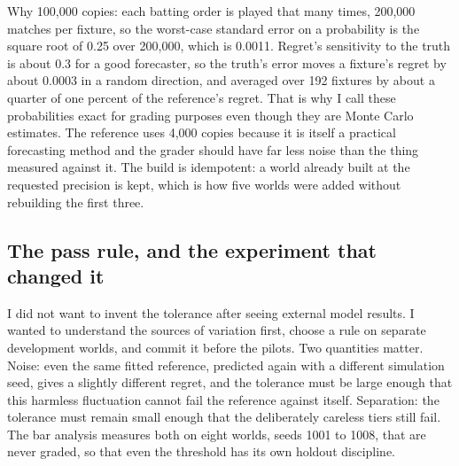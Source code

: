 \documentclass[11pt,letterpaper]{article}
\begin{document}
Why 100,000 copies: each batting order is played that many times, 200,000 matches per fixture, so the worst-case standard error on a probability is the square root of 0.25 over 200,000, which is 0.0011. Regret's sensitivity to the truth is about 0.3 for a good forecaster, so the truth's error moves a fixture's regret by about 0.0003 in a random direction, and averaged over 192 fixtures by about a quarter of one percent of the reference's regret. That is why I call these probabilities exact for grading purposes even though they are Monte Carlo estimates. The reference uses 4,000 copies because it is itself a practical forecasting method and the grader should have far less noise than the thing measured against it. The build is idempotent: a world already built at the requested precision is kept, which is how five worlds were added without rebuilding the first three.


\subsection{The pass rule, and the experiment that changed it}

I did not want to invent the tolerance after seeing external model results. I wanted to understand the sources of variation first, choose a rule on separate development worlds, and commit it before the pilots. Two quantities matter. Noise: even the same fitted reference, predicted again with a different simulation seed, gives a slightly different regret, and the tolerance must be large enough that this harmless fluctuation cannot fail the reference against itself. Separation: the tolerance must remain small enough that the deliberately careless tiers still fail. The bar analysis measures both on eight worlds, seeds 1001 to 1008, that are never graded, so that even the threshold has its own holdout discipline.
\end{document}
